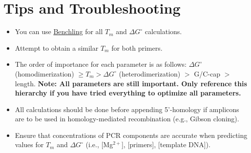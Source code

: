 \documentclass[twocolumn]{article}
\begin{document}
\section{Tips and Troubleshooting}
\begin{itemize}
	\item You can use \href{https://benchling.com/editor}{Benchling} for all $T_m$ and $\Delta G^\circ$ calculations.
	\item Attempt to obtain a similar $T_m$ for both primers.
	\item The order of importance for each parameter is as follows:  $\Delta G^\circ$ (homodimerization) $\ge T_m > \Delta G^\circ$ (heterodimerization) $>$ G/C-cap $>$ length. \textbf{Note: All parameters are still important. Only reference this hierarchy if you have tried everything to optimize all parameters.}
	\item All calculations should be done before appending 5'-homology if amplicons are to be used in homology-mediated recombination (e.g., Gibson cloning).
	\item Ensure that concentrations of PCR components are accurate when predicting values for  $T_m$ and $\Delta G^\circ$ (i.e., [Mg$^{2+}$], [primers], [template DNA]).
\end{itemize}

%
%
\end{document}
